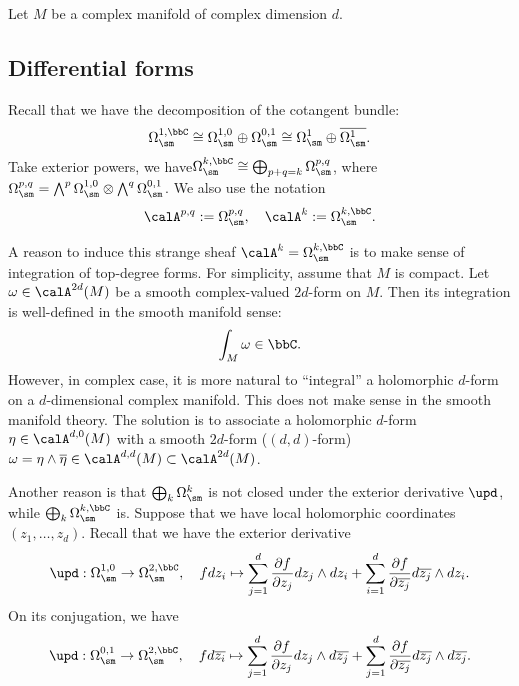     Let \(M\) be a complex manifold of complex dimension \(d\).


\subsection{Differential forms}

    Recall that we have the decomposition of the cotangent bundle:
    \[ \Omega_{\sm}^{1,\bbC} \cong \Omega_{\sm}^{1,0} \oplus \Omega_{\sm}^{0,1} \cong \Omega_{\sm}^1 \oplus \overline{\Omega_{\sm}^1}. \]
    Take exterior powers, we have\( \Omega_{\sm}^{k,\bbC} \cong \bigoplus_{p+q=k} \Omega_{\sm}^{p,q} \),
    where \(\Omega_{\sm}^{p,q} = \bigwedge^p \Omega_{\sm}^{1,0} \otimes \bigwedge^q \Omega_{\sm}^{0,1}\).
    We also use the notation
    \[ \calA^{p,q} := \Omega_{\sm}^{p,q}, \quad \calA^{k} := \Omega_{\sm}^{k,\bbC}. \]
    
    A reason to induce this strange sheaf \(\calA^{k} = \Omega_{\sm}^{k,\bbC}\) is to make sense of integration of top-degree forms.
    For simplicity, assume that \(M\) is compact.
    Let \(\omega \in \calA^{2d}(M)\) be a smooth complex-valued \(2d\)-form on \(M\).
    Then its integration is well-defined in the smooth manifold sense:
    \[ \int_M \omega \in \bbC. \]
    However, in complex case, it is more natural to ``integral'' a holomorphic \(d\)-form on a \(d\)-dimensional complex manifold.
    This does not make sense in the smooth manifold theory.
    The solution is to associate a holomorphic \(d\)-form \(\eta \in \calA^{d,0}(M)\) with a smooth \(2d\)-form (\((d,d)\)-form) \(\omega = \eta \wedge \overline{\eta} \in \calA^{d,d}(M) \subset \calA^{2d}(M)\).

    Another reason  is that \(\bigoplus_k \Omega_{\sm}^{k}\) is not closed under the exterior derivative \(\upd\), while \(\bigoplus_k \Omega_{\sm}^{k,\bbC}\) is. 
    Suppose that we have local holomorphic coordinates \((z_1, \ldots, z_d)\).
    Recall that we have the exterior derivative
    \[ \upd: \Omega_{\sm}^{1,0} \to \Omega_{\sm}^{2,\bbC}, \quad f d z_{i} \mapsto \sum_{j=1}^d \frac{\partial f}{\partial z_j} d z_j \wedge d z_{i} + \sum_{i=1}^d \frac{\partial f}{\partial \overline{z_j}} d \overline{z_j} \wedge d z_{i}. \]
    On its conjugation, we have
    \[ \upd: \Omega_{\sm}^{0,1} \to \Omega_{\sm}^{2,\bbC}, \quad f d \overline{z_{i}} \mapsto \sum_{j=1}^d \frac{\partial f}{\partial z_j} d z_j \wedge d \overline{z_{j}} + \sum_{j=1}^d \frac{\partial f}{\partial \overline{z_j}} d \overline{z_j} \wedge d \overline{z_{j}}. \]

